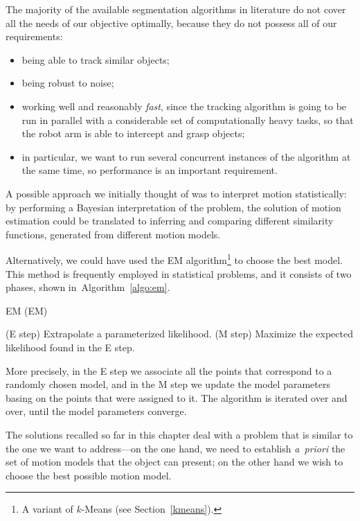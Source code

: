 The majority of the available segmentation algorithms in literature do not cover all the needs of our objective optimally, because they do not possess all of our requirements:
\begin{itemize}
\item being able to track similar objects;

\item being robust to noise;

\item working well and reasonably \emph{fast}, since the tracking algorithm is going to be run in parallel with a considerable set of computationally heavy tasks, so that the robot arm is able to intercept and grasp objects;

\item in particular, we want to run several concurrent instances of the algorithm at the same time, so performance is an important requirement.
\end{itemize}

\bigskip

A possible approach we initially thought of was to interpret motion statistically: by performing a Bayesian interpretation of the problem, the solution of motion estimation could be translated to inferring and comparing different similarity functions, generated from different motion models.

Alternatively, we could have used the \ac{EM} algorithm\footnote{A variant of $k$-Means (see Section~\ref{kmeans}).} to choose the best model. This method is frequently employed in statistical problems, and it consists of two phases, shown in~Algorithm~\ref{algo:em}.

\begin{algorithm}
\caption{\acl{EM} (\acs{EM})}
\label{algo:em}
\begin{algorithmic}[1]
\STATE (E step) Extrapolate a parameterized likelihood.
\STATE (M step) Maximize the expected likelihood found in the E step.
\end{algorithmic}
\end{algorithm}

More precisely, in the E step we associate all the points that correspond to a randomly chosen model, and in the M step we update the model parameters basing on the points that were assigned to it. The algorithm is iterated over and over, until the model parameters converge.

The solutions recalled so far in this chapter deal with a problem that is similar to the one we want to address---on the one hand, we need to establish \emph{a~priori} the set of motion models that the object can present; on the other hand we wish to choose the best possible motion model.

